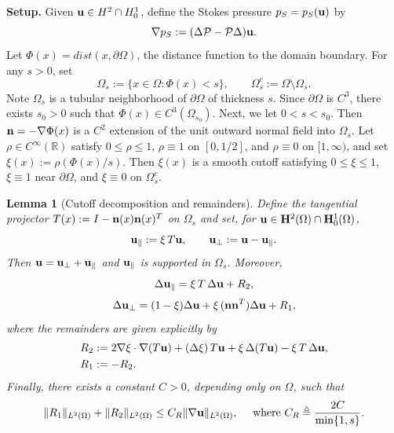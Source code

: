 \documentclass{article}
\newtheorem{lemma}[theorem]{Lemma}          %
\theoremstyle{definition}                   %
\begin{document}
\medskip

\noindent
\textbf{Setup.}
Given ${\bf u}\in H^2\cap H^1_0$, define the Stokes pressure $p_S=p_S({\bf u})$ by
\begin{equation}\label{eq:ps-def}
\nabla p_S := (\Delta\mathcal{P}-\mathcal{P}\Delta){\bf u}.
\end{equation}
Let $\Phi(x)=dist(x,\partial\Omega)$, the distance function to the domain boundary. 
For any $s>0$,  set
\[
\Omega_s:=\{x\in\Omega:\Phi(x)<s\},\qquad \Omega_s^c:=\Omega\setminus\Omega_s.
\]
Note $\Omega_s$ is a tubular neighborhood of $\partial\Omega$ of thickness $s$. 
Since $\partial\Omega$ is $C^3$, there exists $s_0>0$ such that $\Phi(x)\in C^3(\Omega_{s_0})$. Next, we let $0<s<s_0$. 
Then ${\bf n}=-\nabla\Phi(x)$ is a  $C^2$ extension of the unit outward normal field into $\Omega_s$. 
Let $\rho\in C^\infty(\mathbb{R})$ satisfy $0\le \rho\le 1$,
$\rho\equiv 1$ on $[0,1/2]$, and $\rho\equiv 0$ on $[1,\infty)$, and set
$\xi(x):=\rho(\Phi(x)/s)$.
Then $\xi(x)$ is a smooth cutoff satisfying $0\le\xi\le 1$,
$\xi\equiv 1$ near $\partial\Omega$, and $\xi\equiv 0$ on $\Omega_s^c$.



\begin{lemma}[Cutoff decomposition and remainders]\label{lem:decomp-proof}
Define the tangential projector $T(x):=I-{\bf n}(x){\bf n}(x)^T$ on $\Omega_s$ and
set, for ${\bf u}\in {\bf H}^2(\Omega)\cap {\bf H}^1_0(\Omega)$,
\[
{\bf u}_\parallel := \xi\,T{\bf u},
\qquad
{\bf u}_\perp := {\bf u}-{\bf u}_\parallel.
\]
Then ${\bf u}={\bf u}_\perp+{\bf u}_\parallel$ and ${\bf u}_\parallel$ is supported
in $\Omega_s$. Moreover,
\begin{equation}\label{eq:Delta-u-par}
\Delta{\bf u}_\parallel
=
\xi\,T\,\Delta{\bf u} + R_2,
\end{equation}
\begin{equation}\label{eq:Delta-u-perp}
\Delta{\bf u}_\perp
=
(1-\xi)\Delta{\bf u} + \xi\,({\bf n}{\bf n}^T)\Delta{\bf u} + R_1,
\end{equation}
where the remainders are given explicitly by
\begin{align}
R_2 &:= 2\nabla \xi\cdot \nabla(T{\bf u})
      + (\Delta \xi)\,T{\bf u}
      + \xi\,\Delta(T{\bf u}) - \xi\,T\,\Delta{\bf u}, \label{eq:R2-def}\\
R_1 &:= -R_2. \label{eq:R1-def}
\end{align}
Finally, there exists a constant $C>0$, depending only on $\Omega$, such that
\begin{equation}\label{eq:Rbound-s}
\|R_1\|_{L^2(\Omega)}+\|R_2\|_{L^2(\Omega)}
\le
C_R\|\nabla{\bf u}\|_{L^2(\Omega)},
\quad \text{ where } C_R \triangleq \frac{2C}{\min\{1,s \}}.
\end{equation}
\end{lemma}
\end{document}
